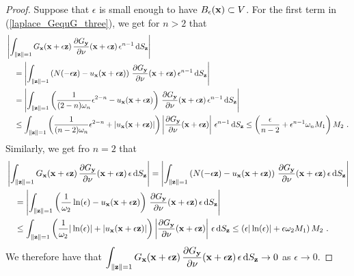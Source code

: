 \begin{proof}
Suppose that $\epsilon$ is small enough to have
$B_\epsilon(\mathbf{x}) \subset V$.
For the first term in (\ref{laplace_GequG_three}),
we get for $n>2$ that
\begin{align*}
&\left| \int_{\|\mathbf{z}\|=1}
G_{\mathbf{x}}(\mathbf{x}+\epsilon \mathbf{z})
\,\frac{\partial{G_{\mathbf{y}}}}{\partial \mathbf{\nu}}(\mathbf{x}+\epsilon \mathbf{z})
\, \epsilon^{n-1} \,\mathrm{d}{S}_{\mathbf{z}} \right| \\
&\quad = \left| \int_{\|\mathbf{z}\|=1}
\left( N(-\epsilon\mathbf{z}) - u_{\mathbf{x}}(\mathbf{x} + \epsilon \mathbf{z}) \right)
\,\frac{\partial{G_{\mathbf{y}}}}{\partial \mathbf{\nu}}(\mathbf{x}+\epsilon \mathbf{z})
\,\epsilon^{n-1} \,\mathrm{d}{S}_{\mathbf{z}} \right| \\
&\quad = \left| \int_{\|\mathbf{z}\|=1}
\left( \frac{1}{(2-n)\omega_n} \epsilon^{2-n} -
u_{\mathbf{x}}(\mathbf{x} + \epsilon \mathbf{z})  \right)
\,\frac{\partial{G_{\mathbf{y}}}}{\partial \mathbf{\nu}}(\mathbf{x} + \epsilon \mathbf{z})
\, \epsilon^{n-1} \,\mathrm{d}{S}_{\mathbf{z}} \right| \\
&\quad \leq \int_{\|\mathbf{z}\|=1}
\left( \frac{1}{(n-2)\omega_n} \epsilon^{2-n} +
\left| u_{\mathbf{x}}(\mathbf{x} + \epsilon \mathbf{z}) \right| \right)
\left| \frac{\partial{G_{\mathbf{y}}}}{\partial \mathbf{\nu}}(\mathbf{x} + \epsilon \mathbf{z})
\right|\, \epsilon^{n-1} \,\mathrm{d}{S}_{\mathbf{z}} \leq \left(\frac{\epsilon}{n-2} +
\epsilon^{n-1} \omega_n M_1\right) M_2 \ . 
\end{align*}
Similarly, we get fro $n=2$ that
\begin{align*}
&\left| \int_{\|\mathbf{z}\|=1}
G_{\mathbf{x}}(\mathbf{x}+\epsilon \mathbf{z})
\,\frac{\partial{G_{\mathbf{y}}}}{\partial \mathbf{\nu}}(\mathbf{x}+\epsilon \mathbf{z})
\, \epsilon \,\mathrm{d}{S}_{\mathbf{z}} \right|
= \left| \int_{\|\mathbf{z}\|=1}
\left( N(-\epsilon\mathbf{z}) - u_{\mathbf{x}}(\mathbf{x} + \epsilon \mathbf{z}) \right)
\,\frac{\partial{G_{\mathbf{y}}}}{\partial \mathbf{\nu}}(\mathbf{x}+\epsilon \mathbf{z})
\, \epsilon \,\mathrm{d}{S}_{\mathbf{z}} \right| \\
&\quad = \left| \int_{\|\mathbf{z}\|=1}
\left( \frac{1}{\omega_2} \ln(\epsilon) -
u_{\mathbf{x}}(\mathbf{x} + \epsilon \mathbf{z}) \right)
\,\frac{\partial{G_{\mathbf{y}}}}{\partial \mathbf{\nu}}(\mathbf{x} + \epsilon \mathbf{z})
\, \epsilon \,\mathrm{d}{S}_{\mathbf{z}} \right| \\
&\quad \leq \int_{\|\mathbf{z}\|=1}
\left( \frac{1}{\omega_2} |\ln(\epsilon)|  +
\left| u_{\mathbf{x}}(\mathbf{x} + \epsilon \mathbf{z}) \right| \right)
\left| \frac{\partial{G_{\mathbf{y}}}}{\partial \mathbf{\nu}}(\mathbf{x} + \epsilon \mathbf{z})
\right|\, \epsilon \,\mathrm{d}{S}_{\mathbf{z}}
\leq \left( \epsilon |\ln(\epsilon)| + \epsilon \omega_2 M_1 \right) M_2 \ . 
\end{align*}
We therefore have that
$\displaystyle \int_{\|\mathbf{z}\|=1}
G_{\mathbf{x}}(\mathbf{x}+\epsilon \mathbf{z})
\,\frac{\partial{G_{\mathbf{y}}}}{\partial \mathbf{\nu}}(\mathbf{x}+\epsilon \mathbf{z})
\, \epsilon \,\mathrm{d}{S}_{\mathbf{z}} \to 0$ 
as $\epsilon \to 0$.


\end{proof}

